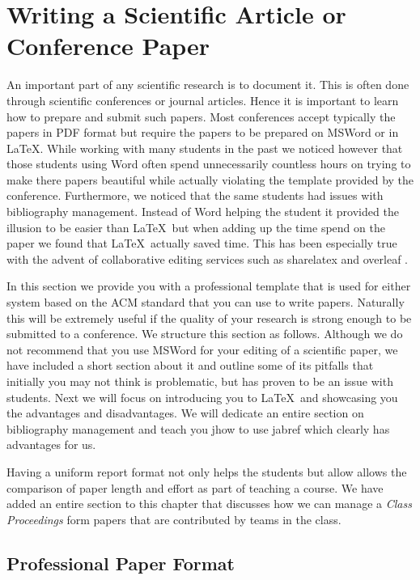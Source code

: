 \FILENAME

\section{Writing a Scientific Article or Conference Paper}
\label{S:writing}

An important part of any scientific research is to document it. This is
often done through scientific conferences or journal articles. Hence it
is important to learn how to prepare and submit such papers. Most
conferences accept typically the papers in PDF format but require the
papers to be prepared on MSWord or in \LaTeX. While working with many
students in the past we noticed however that those students using Word
often spend unnecessarily countless hours on trying to make there papers
beautiful while actually violating the template provided by the
conference. Furthermore, we noticed that the same students had issues
with bibliography management. Instead of Word helping the student it
provided the illusion to be easier than \LaTeX~but when adding up the
time spend on the paper we found that \LaTeX~actually saved time. This
has been especially true with the advent of collaborative editing
services such as sharelatex \cite{www-sharelatex} and overleaf
\cite{www-overleaf}. 

In this section we provide you with a professional template that is used
for either system based on the ACM standard that you can use to write
papers. Naturally this will be extremely useful if the quality of your
research is strong enough to be submitted to a conference. We structure
this section as follows. Although we do not recommend that you use
MSWord for your editing of a scientific paper, we have included a short
section about it and outline some of its pitfalls that initially you may
not think is problematic, but has proven to be an issue with students.
Next we will focus on introducing you to \LaTeX~and showcasing you the
advantages and disadvantages. We will dedicate an entire section on
bibliography management and teach you jhow to use jabref which clearly
has advantages for us.

Having a uniform report format not only helps the students but allow
allows the comparison of paper length and effort as part of teaching a
course. We have added an entire section to this chapter that discusses
how we can manage a \emph{Class Proceedings} form papers that are
contributed by teams in the class.

\subsection{Professional Paper Format}\label{professional-paper-format}


